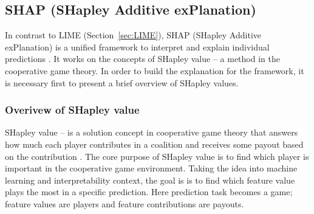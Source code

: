 \documentclass[english]{tktltiki2}
\theoremstyle{definition}
\theoremstyle{remark}
\begin{document}
\subsection{SHAP (SHapley Additive exPlanation)}\label{sec:SHAP} %

In contrast to LIME (Section~\ref{sec:LIME}), SHAP (SHapley Additive exPlanation) is a unified framework to interpret and explain individual predictions \citep{lundberg2017unified}. It works on the concepts of SHapley value \citep{shapley1953value} -- a method in the cooperative game theory. In order to build the explanation for the framework, it is necessary first to present a brief overview of SHapley values. 

\subsubsection{Overivew of SHapley value} %
SHapley value -- is a solution concept in cooperative game theory that answers how much each player contributes in a coalition and receives some payout based on the contribution \citep{shapley1953value}. The core purpose of SHapley value is to find which player is important in the cooperative game environment. Taking the idea into machine learning and interpretability context, the goal is is to find which feature value plays the most in a specific prediction. Here prediction task becomes a game; feature values are players and feature contributions are payouts.
\end{document}
